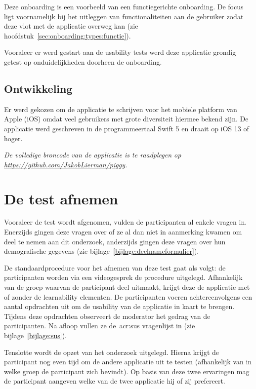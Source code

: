 Deze onboarding is een voorbeeld van een functiegerichte onboarding. De focus ligt voornamelijk bij het uitleggen van functionaliteiten aan de gebruiker zodat deze vlot met de applicatie overweg kan (zie hoofdstuk~\ref{sec:onboarding:types:functie}).

Vooraleer er werd gestart aan de usability tests werd deze applicatie grondig getest op onduidelijkheden doorheen de onboarding.

\subsection{Ontwikkeling}
\label{sec:applicatie:ontwikkeling}

Er werd gekozen om de applicatie te schrijven voor het mobiele platform van Apple (iOS) omdat veel gebruikers met grote diversiteit hiermee bekend zijn. De applicatie werd geschreven in de programmeertaal Swift 5 en draait op iOS 13 of hoger.

\textit{De volledige broncode van de applicatie is te raadplegen op \url{https://github.com/JakobLierman/piggy}.}

\section{De test afnemen}
\label{sec:test-afnemen}

Vooraleer de test wordt afgenomen, vulden de participanten al enkele vragen in. Enerzijds gingen deze vragen over of ze al dan niet in aanmerking kwamen om deel te nemen aan dit onderzoek, anderzijds gingen deze vragen over hun demografische gegevens (zie bijlage~\ref{bijlage:deelnameformulier}).

De standaardprocedure voor het afnemen van deze test gaat als volgt: de participanten worden via een videogesprek de procedure uitgelegd. Afhankelijk van de groep waarvan de participant deel uitmaakt, krijgt deze de applicatie met of zonder de learnability elementen. De participanten voeren achtereenvolgens een aantal opdrachten uit om de usability van de applicatie in kaart te brengen. Tijdens deze opdrachten observeert de moderator het gedrag van de participanten. Na afloop vullen ze de~\acrshort{acr:sus} vragenlijst in (zie bijlage~\ref{bijlage:sus}).

Tenslotte wordt de opzet van het onderzoek uitgelegd. Hierna krijgt de participant nog even tijd om de andere applicatie uit te testen (afhankelijk van in welke groep de participant zich bevindt). Op basis van deze twee ervaringen mag de participant aangeven welke van de twee applicatie hij of zij prefereert.

